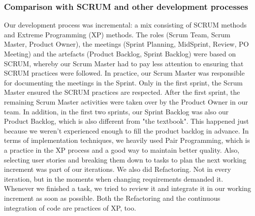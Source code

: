 \subsubsection{Comparison with SCRUM and other development processes}
Our development process was incremental: a mix consisting of SCRUM methods and Extreme Programming (XP) methods.
The roles (Scrum Team, Scrum Master, Product Owner), the meetings (Sprint Planning, MidSprint, Review, PO Meeting) and the artefacts (Product Backlog, Sprint Backlog) were based on SCRUM, whereby our Scrum Master had to pay less attention to ensuring that SCRUM practices were followed.
In practice, our Scrum Master was responsible for documenting the meetings in the Sprint.
Only in the first sprint, the Scrum Master ensured the SCRUM practices are respected.
After the first sprint, the remaining Scrum Master activities were taken over by the Product Owner in our team.
In addition, in the first two sprints, our Sprint Backlog was also our Product Backlog, which is also different from "the textbook".
This happened just because we weren't experienced enough to fill the product backlog in advance.
In terms of implementation techniques, we heavily used Pair Programming, which is a practice in the XP process and a good way to maintain better quality.
Also, selecting user stories and breaking them down to tasks to plan the next working increment was part of our iterations.
We also did Refactoring.
Not in every iteration, but in the moments when changing requirements demanded it.
Whenever we finished a task, we tried to review it and integrate it in our working increment as soon as possible.
Both the Refactoring and the continuous integration of code are practices of XP, too.
